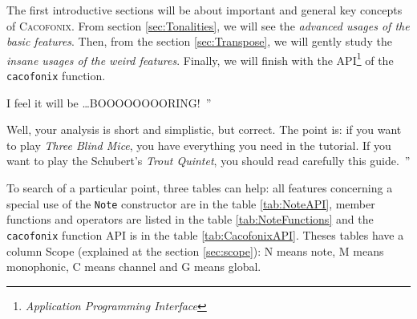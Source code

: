 \documentclass{article}
\newcommand{\cacofonix}{\textsc{Cacofonix}\xspace}
\newcommand{\note}{\lstinline!Note!\xspace}
\newenvironment{meenv}{ \par \noindent \makebox[6em][r]{ \textcolor{mecolor}{Me}: `` --~}}{~''}
\newenvironment{myselfenv}{ \par \noindent \makebox[6em][r]{ \textcolor{myselfcolor}{Myself}: `` --~}}{~''}
\newcommand{\me}[1]{\begin{meenv}#1\end{meenv}}
\newcommand{\myself}[1]{\begin{myselfenv}#1\end{myselfenv}}
\begin{document}
The first introductive sections will be about important and general key concepts of \cacofonix. From section \ref{sec:Tonalities}, we will see the \emph{advanced usages of the basic features}. Then, from the section \ref{sec:Transpose}, we will gently study the \emph{insane usages of the weird features}. Finally, we will finish with the API\footnote{\emph{Application Programming Interface}} of the \lstinline!cacofonix! function.

\me{I feel it will be \dots BOOOOOOOORING!}
\myself{Well, your analysis is short and simplistic, but correct. The point is: if you want to play \emph{Three Blind Mice}, you have everything you need in the tutorial. If you want to play the Schubert's \emph{Trout Quintet}, you should read carefully this guide.}

To search of a particular point, three tables can help: all features concerning a special use of the \note constructor are in the table \ref{tab:NoteAPI}, member functions and operators are listed in the table \ref{tab:NoteFunctions} and the \lstinline!cacofonix! function API is in the table \ref{tab:CacofonixAPI}. Theses tables have a column Scope (explained at the section \ref{sec:scope}): N means note, M means monophonic, C means channel and G means global.
\end{document}
